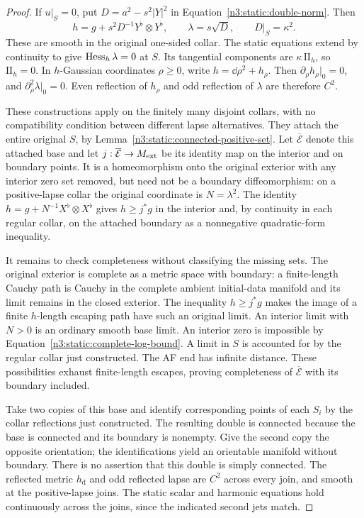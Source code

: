 \begin{proof}
If \(u|_S=0\), put \(D=a^2-s^2|Y|^2\) in
Equation~\eqref{n3:static:double-norm}. Then
\[
h=g+s^2D^{-1}Y^\flat\otimes Y^\flat,\qquad
\lambda=s\sqrt D,\qquad D|_S=\kappa^2.
\]
These are smooth in the original one-sided collar.
The static equations extend by continuity to give
\(\operatorname{Hess}_h\lambda=0\) at \(S\).
Its tangential components are
\(\kappa\,\mathrm{II}_h\), so \(\mathrm{II}_h=0\).
In \(h\)-Gaussian coordinates \(\rho\geq0\), write
\(h=\dd\rho^2+h_\rho\). Then
\(\partial_\rho h_\rho|_0=0\), and
\(\partial_\rho^2\lambda|_0=0\).
Even reflection of \(h_\rho\) and odd reflection of \(\lambda\)
are therefore \(C^2\).

These constructions apply on the finitely many disjoint collars,
with no compatibility condition between different lapse alternatives.
They attach the entire original $S$, by
Lemma~\ref{n3:static:connected-positive-set}. Let $\overline{\mathcal E}$
denote this attached base and let $j:\overline{\mathcal E}\to M_{\mathrm{ext}}$
be its identity map on the interior and on boundary points. It is a
homeomorphism onto the original exterior with any interior zero set
removed, but need not be a boundary diffeomorphism: on a positive-lapse
collar the original coordinate is $N=\lambda^2$. The identity
$h=g+N^{-1}X^\flat\otimes X^\flat$ gives
$h\geq j^*g$ in the interior and, by continuity in each regular collar,
on the attached boundary as a nonnegative quadratic-form inequality.

It remains to check completeness without classifying the missing
sets. The original exterior is complete as a metric space with
boundary: a finite-length Cauchy path is Cauchy in the complete
ambient initial-data manifold and its limit remains in the closed
exterior. The inequality $h\geq j^*g$ makes the image of a finite
$h$-length escaping path have such an original limit.
An interior limit with \(N>0\) is an ordinary smooth base limit.
An interior zero is impossible by
Equation~\eqref{n3:static:complete-log-bound}.
A limit in \(S\) is accounted for by the regular collar just
constructed. The AF end has infinite distance.
These possibilities exhaust finite-length escapes, proving completeness
of $\overline{\mathcal E}$ with its boundary included.

Take two copies of this base and identify corresponding points of
each $S_i$ by the collar reflections just constructed. The resulting
double is connected because the base is connected and its boundary
is nonempty. Give the second copy the opposite orientation; the
identifications yield an orientable manifold without boundary.
There is no assertion that this double is simply connected.
The reflected metric $h_{\mathrm d}$ and odd reflected lapse are
$C^2$ across every join, and smooth at the positive-lapse joins.
The static scalar and harmonic equations hold continuously across
the joins, since the indicated second jets match.


\end{proof}
